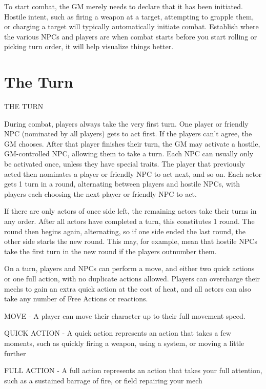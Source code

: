 To start combat, the GM merely needs to declare that it has been initiated. Hostile intent, such
as firing a weapon at a target, attempting to grapple them, or charging a target will typically
automatically initiate combat. Establish where the various NPCs and players are when combat
starts before you start rolling or picking turn order, it will help visualize things better.

\chapter{The Turn}
                                                THE TURN




During combat, players always take the very first turn. One player or friendly NPC (nominated
by all players) gets to act first. If the players can’t agree, the GM chooses. After that player
finishes their turn, the GM may activate a hostile, GM-controlled NPC, allowing them to take a
turn. Each NPC can usually only be activated once, unless they have special traits. The player
that previously acted then nominates a player or friendly NPC to act next, and so on. Each
actor gets 1 turn in a round, alternating between players and hostile NPCs, with players each
choosing the next player or friendly NPC to act.


If there are only actors of once side left, the remaining actors take their turns in any order. After
all actors have completed a turn, this constitutes 1 round. The round then begins again,
alternating, so if one side ended the last round, the other side starts the new round. This may, for
example, mean that hostile NPCs take the first turn in the new round if the players outnumber
them.

On a turn, players and NPCs can perform a move, and either two quick actions or one full
action, with no duplicate actions allowed. Players can overcharge their mechs to gain an extra
quick action at the cost of heat, and all actors can also take any number of Free Actions or
reactions.


MOVE - A player can move their character up to their full movement speed.

QUICK ACTION - A quick action represents an action that takes a few moments, such as
quickly firing a weapon, using a system, or moving a little further

FULL ACTION - A full action represents an action that takes your full attention, such as a
sustained barrage of fire, or field repairing your mech

